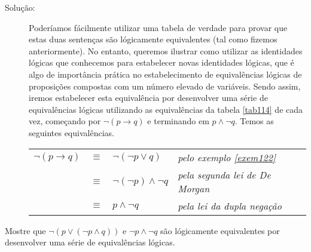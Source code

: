 \begin{description}
\item[Solução:] Poderíamos fácilmente utilizar uma tabela de verdade para provar
que estas duas sentenças são lógicamente equivalentes (tal como fizemos
anteriormente). No entanto, queremos ilustrar como utilizar as identidades
lógicas que conhecemos para estabelecer novas identidades lógicas, que é algo de
importância prática no estabelecimento de equivalências lógicas de proposições
compostas com um número elevado de variáveis. Sendo assim, iremos estabelecer
esta equivalência por desenvolver uma série de equivalências lógicas utilizando
as equivalências da tabela \ref{tab114} de cada vez, começando por $\lnot
(p \to q)$ e terminando em $p \land \lnot q$. Temos as seguintes equivalências.

 \begin{table}[H]
	\centering
	\begin{tabular}{rcll}%
	$\lnot (p \to q)$ & $\equiv$ & $\lnot (\lnot p \lor q)$ & \emph{pelo exemplo
	\ref{exem122}}\\
	 & $\equiv$ & $\lnot (\lnot p) \land \lnot q$ & \emph{pela segunda lei
	 de De Morgan}\\	
	& $\equiv$ & $p \land \lnot q$ & \emph{pela lei da dupla negação}\\	
	\end{tabular}%
\end{table}
\end{description}


\begin{exmp}
\label{exem126}
Mostre que $\lnot (p \lor (\lnot p \land q))$ e $\lnot p \land \lnot q$ são
lógicamente equivalentes por desenvolver uma série de equivalências lógicas.
\end{exmp}

